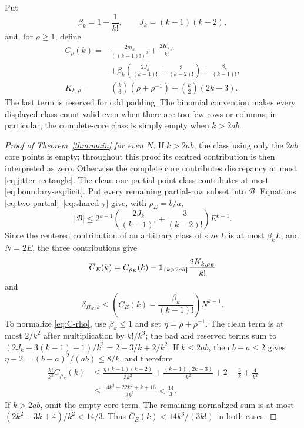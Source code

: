 \documentclass[11pt,letterpaper]{article}
\newcommand{\cB}{\mathcal B}
\begin{document}
Put
\[
 \beta_k=1-\frac1{k!},\qquad J_k=(k-1)(k-2),
\]
and, for $\rho\geq1$, define
\begin{equation}\label{eq:C-rho}
 \begin{aligned}
 C_\rho(k)={}&\frac{2m_k}{((k-1)!)^2}
 +\frac{2K_{k,\rho}}{k!}\\
 &+\beta_k\left(
   \frac{2J_k}{(k-1)!}
  +\frac3{(k-2)!}\right)
  +\frac{\beta_k}{(k-1)!},\\
 K_{k,\rho}={}&\binom{k}{3}(\rho+\rho^{-1})
                 +\binom{k}{2}(2k-3).
 \end{aligned}
\end{equation}
The last term is reserved for odd padding.
The binomial convention makes every displayed class
count valid even when there are too few rows or columns; in particular, the
complete-core class is simply empty when $k>2ab$.  \begin{proof}[Proof of Theorem~\ref{thm:main} for even $N$]
If $k>2ab$, the class using only the $2ab$ core points is empty; throughout
this proof its centred contribution is then interpreted as zero.  Otherwise
the complete core contributes discrepancy at most
\eqref{eq:jitter-rectangle}.  The clean one-partial-point class
contributes at most \eqref{eq:boundary-explicit}.  Put every remaining
partial-row subset into $\cB$.  Equations
\eqref{eq:two-partial}--\eqref{eq:shared-y} give, with
$\rho_E=b/a$,
\[
 |\cB|\leq2^{k-1}\left(
  \frac{2J_k}{(k-1)!}
  +\frac3{(k-2)!}\right)E^{k-1}.
\]
Since the centered contribution of an arbitrary class of size $L$ is at
most $\beta_kL$, and $N=2E$, the three contributions give
\[
 \overline C_E(k)=C_{\rho_E}(k)
 -{\bf1}_{\{k>2ab\}}\frac{2K_{k,\rho_E}}{k!}
\]
and
\begin{equation}\label{eq:refined-even}
 \delta_{\Pi_N,k}
 \leq\left(\overline C_E(k)-\frac{\beta_k}{(k-1)!}\right)N^{k-1}.
\end{equation}
To normalize \eqref{eq:C-rho}, use $\beta_k\le1$ and set
$\eta=\rho+\rho^{-1}$.  The clean term is at most $2/k^2$ after
multiplication by $k!/k^3$; the bad and reserved terms sum to
$(2J_k+3(k-1)+1)/k^2=2-3/k+2/k^2$.
If $k\le2ab$, then $b-a\le2$ gives
$\eta-2=(b-a)^2/(ab)\le8/k$, and therefore
\[
\begin{aligned}
 \frac{k!}{k^3}C_{\rho_E}(k)
 &\le\frac{\eta(k-1)(k-2)}{3k^2}
 +\frac{(k-1)(2k-3)}{k^2}+2-\frac3k+\frac4{k^2}\\
 &\le\frac{14k^3-22k^2+k+16}{3k^3}<\frac{14}{3}.
\end{aligned}
\]
If $k>2ab$, omit the empty core term.  The remaining normalized sum is
at most $(2k^2-3k+4)/k^2<14/3$.  Thus
$\overline C_E(k)<14k^3/(3k!)$ in both cases.
\end{proof}
\end{document}
